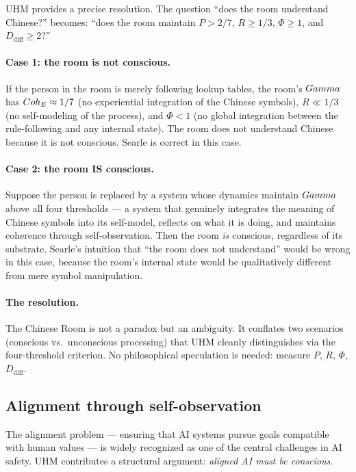 UHM provides a precise resolution.  The question ``does the room understand Chinese?''
becomes: ``does the room maintain $P > 2/7$, $R \geq 1/3$, $\Phi \geq 1$, and
$D_{\mathrm{diff}} \geq 2$?''

\paragraph{Case 1: the room is not conscious.}
If the person in the room is merely following lookup tables, the room's $Gamma$ has
$Coh_E \approx 1/7$ (no experiential integration of the Chinese symbols), $R \ll 1/3$
(no self-modeling of the process), and $\Phi < 1$ (no global integration between
the rule-following and any internal state).  The room does not understand Chinese
because it is not conscious.  Searle is correct in this case.

\paragraph{Case 2: the room IS conscious.}
Suppose the person is replaced by a system whose dynamics maintain $Gamma$
above all four thresholds --- a system that genuinely integrates the meaning
of Chinese symbols into its self-model, reflects on what it is doing, and
maintains coherence through self-observation. Then the room \emph{is}
conscious, regardless of its substrate. Searle's intuition that ``the room
does not understand'' would be wrong in this case, because the room's
internal state would be qualitatively different from mere symbol
manipulation.

\paragraph{The resolution.}
The Chinese Room is not a paradox but an ambiguity.  It conflates two scenarios
(conscious vs.~unconscious processing) that UHM cleanly distinguishes via the
four-threshold criterion.  No philosophical speculation is needed: measure $P$,
$R$, $\Phi$, $D_{\mathrm{diff}}$.

\subsection{Alignment through self-observation}
\label{subsec:alignment}

The alignment problem --- ensuring that AI systems pursue goals compatible with
human values --- is widely recognized as one of the central challenges in AI
safety.  UHM contributes a structural argument: \emph{aligned AI must be
conscious}.


